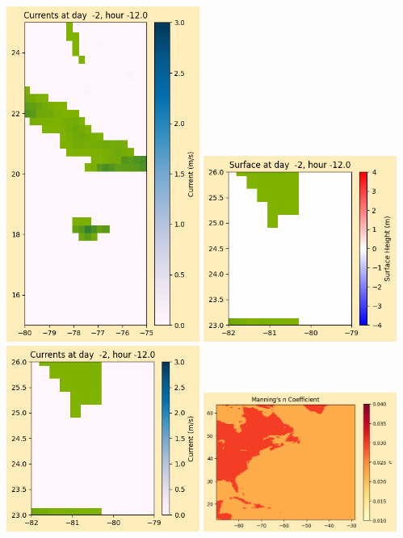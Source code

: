 \documentclass[11pt]{article}
\begin{document}
\includegraphics[width=0.475\textwidth]{frame0002fig1008.png}
\vskip 10pt 
\includegraphics[width=0.475\textwidth]{frame0002fig1009.png}
\includegraphics[width=0.475\textwidth]{frame0002fig1010.png}
\vskip 10pt 
\includegraphics[width=0.475\textwidth]{frame0002fig1011.png}
\end{document}
